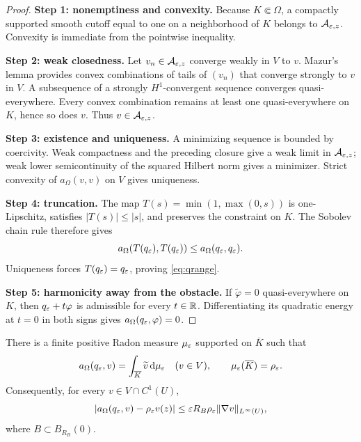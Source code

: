 \begin{proof}
\textbf{Step 1: nonemptiness and convexity.}
Because $K\Subset\Omega$, a compactly supported smooth cutoff equal to one on
a neighborhood of $K$ belongs to $\mathcal A_{\varepsilon,z}$.  Convexity is
immediate from the pointwise inequality.

\textbf{Step 2: weak closedness.}
Let $v_n\in\mathcal A_{\varepsilon,z}$ converge weakly in $V$ to $v$.  Mazur's lemma
provides convex combinations of tails of $(v_n)$ that converge strongly to
$v$ in $V$.  A subsequence of a strongly $H^1$-convergent sequence converges
quasi-everywhere.  Every convex combination remains at least one
quasi-everywhere on $K$, hence so does $v$.  Thus $v\in\mathcal A_{\varepsilon,z}$.

\textbf{Step 3: existence and uniqueness.}
A minimizing sequence is bounded by coercivity.  Weak compactness and the
preceding closure give a weak limit in $\mathcal A_{\varepsilon,z}$; weak lower
semicontinuity of the squared Hilbert norm gives a minimizer.  Strict
convexity of $a_\Omega(v,v)$ on $V$ gives uniqueness.

\textbf{Step 4: truncation.}
The map $T(s)=\min(1,\max(0,s))$ is one-Lipschitz, satisfies
$|T(s)|\le|s|$, and preserves the constraint on $K$.  The Sobolev chain rule
therefore gives
\begin{equation}
 a_\Omega(T(q_\varepsilon),T(q_\varepsilon))
 \le a_\Omega(q_\varepsilon,q_\varepsilon).
\end{equation}
Uniqueness forces $T(q_\varepsilon)=q_\varepsilon$, proving \cref{eq:qrange}.

\textbf{Step 5: harmonicity away from the obstacle.}
If $\widetilde\varphi=0$ quasi-everywhere on $K$, then
$q_\varepsilon+t\varphi$ is admissible for every $t\in\mathbb{R}$.  Differentiating its
quadratic energy at $t=0$ in both signs gives
$a_\Omega(q_\varepsilon,\varphi)=0$.
\end{proof}

\begin{lemma}
\label{lem:capacitymeasure}
There is a finite positive Radon measure $\mu_\varepsilon$ supported on $\overline K$
such that
\begin{equation}
 a_\Omega(q_\varepsilon,v)=\int_{\overline K}\widetilde v\,\mathrm d\mu_\varepsilon
 \quad(v\in V),
 \qquad
 \mu_\varepsilon(\overline K)=\rho_\varepsilon.
 \label{eq:measureidentity}
\end{equation}
Consequently, for every $v\in V\cap C^1(U)$,
\begin{equation}
 |a_\Omega(q_\varepsilon,v)-\rho_\varepsilon v(z)|
 \le \varepsilon R_B\rho_\varepsilon\|\nabla v\|_{L^\infty(U)},
 \label{eq:capacitylocalization}
\end{equation}
where $B\subset B_{R_B}(0)$.
\end{lemma}

